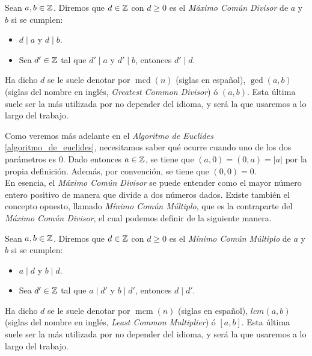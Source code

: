 \begin{definicion}
	Sean $a, b \in \mathbb{Z}$. Diremos que $d \in \mathbb{Z}$ con $d \geq 0$ es el \textit{Máximo Común Divisor} de $a$ y $b$ si se cumplen:
	
	\begin{itemize}
		\item $d \mid a$ y $d \mid b$.
		
		\item Sea $d' \in \mathbb{Z}$ tal que $d' \mid a$ y $d' \mid b$, entonces $d' \mid d$.
	\end{itemize} 
	
	Ha dicho $d$ se le suele denotar por $\mathop{mcd}(n)$ (siglas en español), $\gcd(a, b)$ (siglas del nombre en inglés, \textit{Greatest Common Divisor}) ó $(a, b)$. Esta última suele ser la más utilizada por no depender del idioma, y será la que usaremos a lo largo del trabajo.
\end{definicion}

Como veremos más adelante en el \textit{Algoritmo de Euclides} \ref{algoritmo_de_euclides}, necesitamos saber qué ocurre cuando uno de los dos parámetros es $0$. Dado entonces $a \in \mathbb{Z}$, se tiene que $(a, 0) = (0, a) = |a|$ por la propia definición. Además, por convención, se tiene que $(0, 0) = 0$.\\

En esencia, el \textit{Máximo Común Divisor} se puede entender como el mayor número entero positivo de manera que divide a dos números dados. Existe también el concepto opuesto, llamado \textit{Mínimo Común Múltiplo}, que es la contraparte del \textit{Máximo Común Divisor}, el cual podemos definir de la siguiente manera.

\begin{definicion}
	Sean $a, b \in \mathbb{Z}$. Diremos que $d \in \mathbb{Z}$ con $d \geq 0$ es el \textit{Mínimo Común Múltiplo} de $a$ y $b$ si se cumplen:
	
	\begin{itemize}
		\item $a \mid d$ y $b \mid d$.
		
		\item Sea $d' \in \mathbb{Z}$ tal que $a \mid d'$ y $b \mid d'$, entonces $d \mid d'$.
	\end{itemize} 
	
	Ha dicho $d$ se le suele denotar por $\mathop{mcm}(n)$ (siglas en español), $lcm(a, b)$ (siglas del nombre en inglés, \textit{Least Common Multiplier}) ó $[a, b]$. Esta última suele ser la más utilizada por no depender del idioma, y será la que usaremos a lo largo del trabajo.
\end{definicion}

